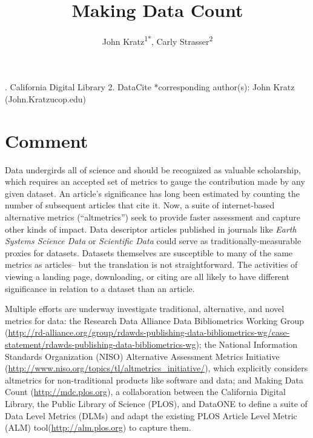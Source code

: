 \documentclass[english]{article}
\begin{document}
\title{Making Data Count}


\author{John Kratz\textsuperscript{1{*}}, Carly Strasser\textsuperscript{2}}

. California Digital Library 2. DataCite 
{*}corresponding author(s): John Kratz (John.Kratzucop.edu)


\section*{Comment}


Data undergirds all of science and should be recognized as valuable scholarship, which requires an accepted set of metrics to gauge the contribution made by any given dataset.
An article's significance has long been estimated by counting the number of subsequent articles that cite it. 
Now, a suite of internet-based alternative metrics (``altmetrics'') seek to provide faster assessment and capture other kinds of impact\cite{priem_altmetrics_2012}.
Data descriptor articles published in journals like \textit{Earth Systems Science Data} or \textit{Scientific Data} could serve as traditionally-measurable proxies for datasets\cite{pfeiffenberger_earth_2011, editors_more_2014}.
Datasets themselves are susceptible to many of the same metrics as articles-- but the translation is not straightforward.
The activities of viewing a landing page, downloading, or citing are all likely to have different significance in relation to a dataset than an article.

Multiple efforts are underway investigate traditional, alternative, and novel metrics for data: the Research Data Alliance Data Bibliometrics Working Group (\url{http://rd-alliance.org/group/rdawds-publishing-data-bibliometrics-wg/case-statement/rdawds-publishing-data-bibliometrics-wg}{}); the National Information Standards Organization (NISO) Alternative Assessment Metrics Initiative (\url{http://www.niso.org/topics/tl/altmetrics_initiative/}), which explicitly considers altmetrics for non-traditional products like software and data; and Making Data Count (\url{http://mdc.plos.org}), a collaboration between the California Digital Library, the Public Library of Science (PLOS), and DataONE to define a suite of Data Level Metrics (DLMs) and adapt the existing PLOS Article Level Metric (ALM) tool(\url{http://alm.plos.org}) to capture them.
\end{document}
